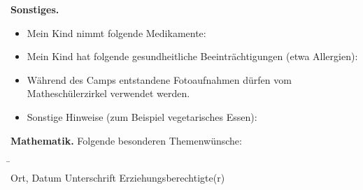 \documentclass{zettel}
\begin{document}
\begin{shaded}
\textbf{Sonstiges.}
\begin{itemize}
  \item[\checkbox] Mein Kind nimmt folgende Medikamente: \\[1em] \freistLang
  \item[\checkbox] Mein Kind hat folgende gesundheitliche Beeinträchtigungen
  (etwa Allergien): \\[1em] \freistLang
  \item[\checkbox] Während des Camps entstandene Fotoaufnahmen dürfen
  vom Matheschülerzirkel verwendet werden.
  \item[\checkbox] Sonstige Hinweise (zum Beispiel vegetarisches Essen): \\[1em]
  \freistLang
\end{itemize}
\end{shaded}

\begin{shaded}
\textbf{Mathematik.} Folgende besonderen Themenwünsche:
\freist{6.2cm}
\end{shaded}

\enlargethispage{0.5cm}

\begin{tabbing}
  \freistMittel \qquad\qquad \= \kill
  \freistMittel \> \freistLaenger \\
  Ort, Datum \> Unterschrift Erziehungsberechtigte(r)
\end{tabbing}
\end{document}
